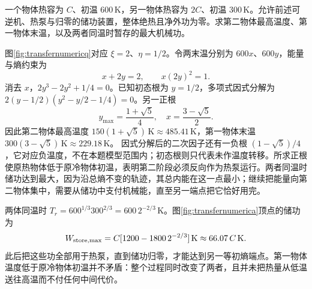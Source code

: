\begin{example}[不同热容物体的温度转移端点]
一个物体热容为 $C$、初温 $600\,\mathrm K$，另一物体热容为 $2C$、初温 $300\,\mathrm K$。允许前述可逆机、热泵与归零的储功装置，整体绝热且净外功为零。求第二物体最高温度、第一物体末温，以及两者同温时暂存的最大机械功。
\end{example}
\begin{solution}
图\ref{fig:transfernumericq}对应 $\xi=2$、$\eta=1/2$。令两末温分别为 $600x$、$600y$，能量与熵约束为
\[
 x+2y=2,\qquad x(2y)^2=1.
\]
消去 $x$，$2y^3-2y^2+1/4=0$。已知初态根为 $y=1/2$，多项式因式分解为 $2(y-1/2)(y^2-y/2-1/4)=0$。另一正根
\[
 y_{\max}=\frac{1+\sqrt5}{4},\quad x=\frac{3-\sqrt5}{2}.
\]
因此第二物体最高温度 $150(1+\sqrt5)\,\mathrm K\approx485.41\,\mathrm K$，第一物体末温 $300(3-\sqrt5)\,\mathrm K\approx229.18\,\mathrm K$。
因式分解后的二次因子还有一负根 $(1-\sqrt5)/4$，它对应负温度，不在本题模型范围内；初态根则只代表未作温度转移。所求正根使原热物体低于原冷物体初温，表明第二阶段必须反向作为热泵运行。两者同温时储功达到最大，因为沿总熵不变的轨迹，其总内能在这一点最小；继续把能量向第二物体集中，需要从储功中支付机械能，直至另一端点把它恰好用完。

两体同温时 $T_r=600^{1/3}300^{2/3}=600\,2^{-2/3}\,\mathrm K$。图\ref{fig:transfernumerica}顶点的储功为
\[
 W_{\rm store,max}=C[1200-1800\,2^{-2/3}]\,\mathrm K
 \approx66.07\,C\,\mathrm K.
\]
此后把这些功全部用于热泵，直到储功归零，才能达到另一等初熵端点。第一物体温度低于原冷物体初温并不矛盾：整个过程同时改变了两者，且并未把热量从低温送往高温而不付任何中间代价。
\end{solution}

